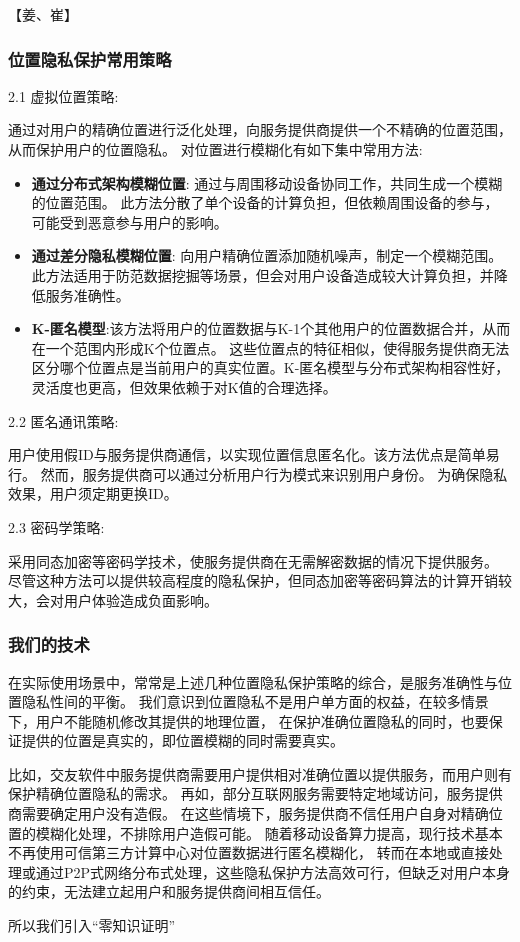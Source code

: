 \documentclass[zihao=-4]{ctexart}
\begin{document}
【姜、崔】
\subsubsection{位置隐私保护常用策略}
2.1 虚拟位置策略: \par
通过对用户的精确位置进行泛化处理，向服务提供商提供一个不精确的位置范围，从而保护用户的位置隐私。
对位置进行模糊化有如下集中常用方法:
\begin{itemize}
  \item \textbf{通过分布式架构模糊位置}: 通过与周围移动设备协同工作，共同生成一个模糊的位置范围。
  此方法分散了单个设备的计算负担，但依赖周围设备的参与，可能受到恶意参与用户的影响。
  \item \textbf{通过差分隐私模糊位置}: 向用户精确位置添加随机噪声，制定一个模糊范围。此方法适用于防范数据挖掘等场景，但会对用户设备造成较大计算负担，并降低服务准确性。
  \item \textbf{K-匿名模型}:该方法将用户的位置数据与K-1个其他用户的位置数据合并，从而在一个范围内形成K个位置点。
  这些位置点的特征相似，使得服务提供商无法区分哪个位置点是当前用户的真实位置。K-匿名模型与分布式架构相容性好，灵活度也更高，但效果依赖于对K值的合理选择。
\end{itemize}
\par
2.2 匿名通讯策略: \par
用户使用假ID与服务提供商通信，以实现位置信息匿名化。该方法优点是简单易行。
然而，服务提供商可以通过分析用户行为模式来识别用户身份。
为确保隐私效果，用户须定期更换ID。
\par
2.3 密码学策略: \par
采用同态加密等密码学技术，使服务提供商在无需解密数据的情况下提供服务。
尽管这种方法可以提供较高程度的隐私保护，但同态加密等密码算法的计算开销较大，会对用户体验造成负面影响。

\subsubsection{我们的技术}
在实际使用场景中，常常是上述几种位置隐私保护策略的综合，是服务准确性与位置隐私性间的平衡。
我们意识到位置隐私不是用户单方面的权益，在较多情景下，用户不能随机修改其提供的地理位置，
在保护准确位置隐私的同时，也要保证提供的位置是真实的，即位置模糊的同时需要真实。
\par
比如，交友软件中服务提供商需要用户提供相对准确位置以提供服务，而用户则有保护精确位置隐私的需求。
再如，部分互联网服务需要特定地域访问，服务提供商需要确定用户没有造假。
在这些情境下，服务提供商不信任用户自身对精确位置的模糊化处理，不排除用户造假可能。
随着移动设备算力提高，现行技术基本不再使用可信第三方计算中心对位置数据进行匿名模糊化，
转而在本地或直接处理或通过P2P式网络分布式处理，这些隐私保护方法高效可行，但缺乏对用户本身的约束，无法建立起用户和服务提供商间相互信任。
\par
所以我们引入“零知识证明”
\end{document}
